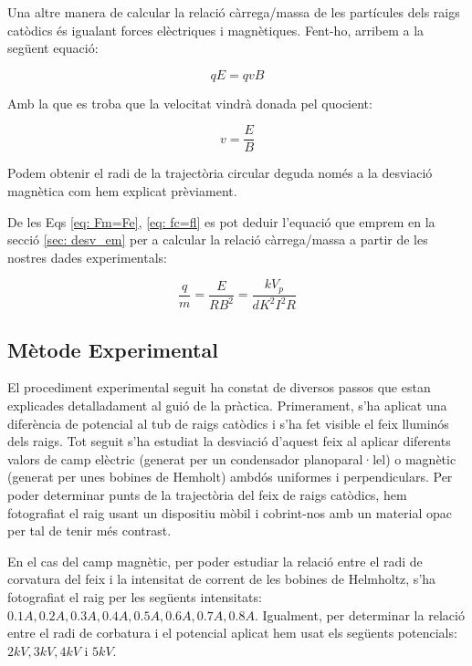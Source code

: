 \documentclass[11pt]{article}
\numberwithin{equation}{section}
\numberwithin{figure}{section}
\numberwithin{table}{section}
\begin{document}
\vspace{1cm}

Una altre manera de calcular la relació càrrega/massa de les partícules dels raigs catòdics és igualant forces elèctriques i magnètiques. Fent-ho, arribem a la següent equació:

\begin{equation}\label{eq: Fm=Fe}
    qE = qvB
\end{equation}

Amb la que es troba que la velocitat vindrà donada pel quocient:

\begin{equation}
    v = \frac{E}{B}
\end{equation}

Podem obtenir el radi de la trajectòria circular deguda només a la desviació magnètica com hem explicat prèviament.

De les Eqs \eqref{eq: Fm=Fe}, \eqref{eq: fc=fl} es pot deduir l'equació que emprem en la secció \ref{sec: desv_em} per a calcular la relació càrrega/massa a partir de les nostres dades experimentals:

\begin{equation}
    \frac{q}{m}=\frac{E}{RB^2}=\frac{kV_p}{dK^2I^2R}
\end{equation}

\newpage
\subsection{Mètode Experimental}

El procediment experimental seguit ha constat de diversos passos que estan explicades detalladament al guió de la pràctica. 
Primerament, s'ha aplicat una diferència de potencial al tub de raigs catòdics i s'ha fet visible el feix lluminós dels raigs. Tot seguit s'ha estudiat la desviació d'aquest feix al aplicar diferents valors de camp elèctric (generat per un condensador planoparal·lel) o magnètic (generat per unes bobines de Hemholt) ambdós uniformes i perpendiculars. Per poder determinar punts de la trajectòria del feix de raigs catòdics, hem fotografiat el raig usant un dispositiu mòbil i cobrint-nos amb un material opac per tal de tenir més contrast.

En el cas del camp magnètic, per poder estudiar la relació entre el radi de corvatura del feix i la intensitat de corrent de les bobines de Helmholtz, s'ha fotografiat el raig per les següents intensitats:  $0.1A, 0.2A, 0.3A, 0.4A, 0.5A, 0.6A, 0.7A, 0.8A$. Igualment, per determinar la relació entre el radi de corbatura i el potencial aplicat hem usat els següents potencials: $2kV, 3kV, 4kV$ i $5kV$.
\end{document}
